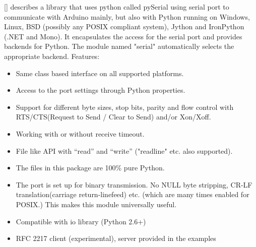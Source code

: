 \documentclass{acm_proc_article-sp}
\begin{document}
\newline
\newline
[] describes a library that uses python called pySerial using serial port to communicate with Arduino mainly, but also with Python running on Windows, Linux, BSD (possibly any POSIX compliant system), Jython and IronPython (.NET and Mono). It encapsulates the access for the serial port and provides backends for Python. The module named "serial" automatically selects the appropriate backend.
\newline
\newline
Features:
\begin{itemize}
\item Same class based interface on all supported platforms.
\item Access to the port settings through Python properties.
\item Support for different byte sizes, stop bits, parity and flow control with RTS/CTS(Request to Send / Clear to Send) and/or Xon/Xoff.
\item Working with or without receive timeout.
\item File like API with “read” and “write” ("readline" etc. also supported).
\item The files in this package are 100\% pure Python.
\item The port is set up for binary transmission. No NULL byte stripping, CR-LF translation(carriage return-linefeed) etc. (which are many times enabled for POSIX.) This makes this module universally useful.
\item Compatible with io library (Python 2.6+)
\item RFC 2217 client (experimental), server provided in the examples
\end{itemize}
\end{document}
